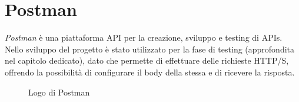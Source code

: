 \section{Postman}
\emph{Postman} è una piattaforma API per la creazione, sviluppo e testing di APIs.\\
Nello sviluppo del progetto è stato utilizzato per la fase di testing (approfondita nel capitolo dedicato), dato che permette di effettuare delle richieste HTTP/S, offrendo la possibilità di configurare il body della stessa e di ricevere la risposta.\\
\begin{figure}[ht]
	\centering
	\caption{Logo di Postman}
	\label{fig:one}
\end{figure}


